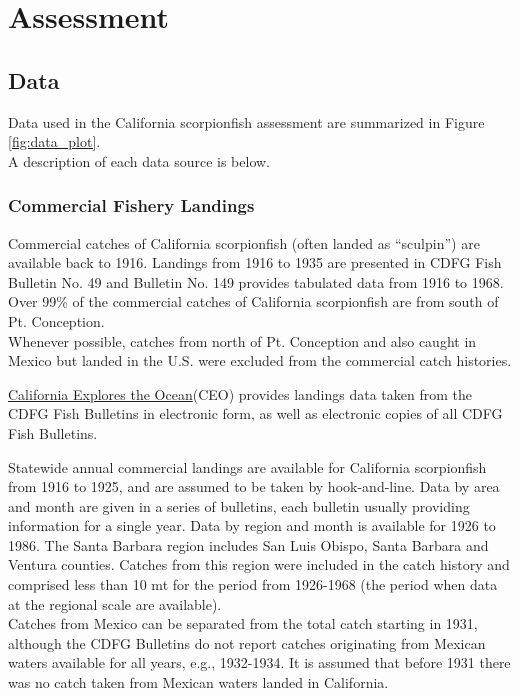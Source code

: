 \documentclass[12pt,]{article}
\begin{document}
\section{Assessment}\label{assessment}

\subsection{Data}\label{data}

Data used in the California scorpionfish assessment are summarized in
Figure \ref{fig:data_plot}.\\
A description of each data source is below.

\subsubsection{Commercial Fishery
Landings}\label{commercial-fishery-landings}

Commercial catches of California scorpionfish (often landed as
``sculpin'') are available back to 1916. Landings from 1916 to 1935 are
presented in CDFG Fish Bulletin No. 49 and Bulletin No. 149 provides
tabulated data from 1916 to 1968. Over 99\% of the commercial catches of
California scorpionfish are from south of Pt. Conception.\\
Whenever possible, catches from north of Pt. Conception and also caught
in Mexico but landed in the U.S. were excluded from the commercial catch
histories.

\href{http://library.ucsd.edu/ceo/fishcatchtables/fish-catch-download.html}{California
Explores the Ocean}(CEO) provides landings data taken from the CDFG Fish
Bulletins in electronic form, as well as electronic copies of all CDFG
Fish Bulletins.

Statewide annual commercial landings are available for California
scorpionfish from 1916 to 1925, and are assumed to be taken by
hook-and-line. Data by area and month are given in a series of
bulletins, each bulletin usually providing information for a single
year. Data by region and month is available for 1926 to 1986. The Santa
Barbara region includes San Luis Obispo, Santa Barbara and Ventura
counties. Catches from this region were included in the catch history
and comprised less than 10 mt for the period from 1926-1968 (the period
when data at the regional scale are available).\\
Catches from Mexico can be separated from the total catch starting in
1931, although the CDFG Bulletins do not report catches originating from
Mexican waters available for all years, e.g., 1932-1934. It is assumed
that before 1931 there was no catch taken from Mexican waters landed in
California.
\end{document}
